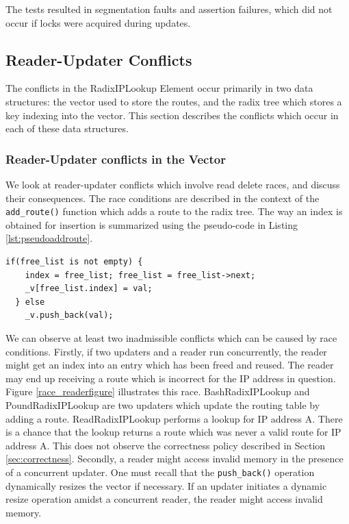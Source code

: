 \documentclass[a4paper]{article}
\begin{document}
The tests resulted in segmentation faults and assertion failures, which did not occur if locks were acquired during updates.
\subsection{Reader-Updater Conflicts}
The conflicts in the RadixIPLookup Element occur primarily in two data structures: the vector used to store the routes, and the radix tree which stores a key indexing into the vector. This section describes the conflicts which occur in each of these data structures.\\

\subsubsection{Reader-Updater conflicts in the Vector}
\label{sec:ruconflictsinthevector}
We look at reader-updater conflicts which involve read delete races, and discuss their consequences.
The race conditions are described in the context of the \verb+add_route()+ function which adds a route
to the radix tree. The way an index is obtained for insertion is
summarized using the pseudo-code in Listing \ref{lst:pseudoaddroute}.
\begin{lstlisting}[caption = Pseudo-code for acquiring an index in \texttt{add\_route()}, label=lst:pseudoaddroute]
  if(free_list is not empty) {
    index = free_list; free_list = free_list->next;
    _v[free_list.index] = val;
  } else
    _v.push_back(val);
\end{lstlisting}
We can observe at least two inadmissible conflicts which can be caused
by race conditions. Firstly, if two updaters and a reader run
concurrently, the reader might get an index into an entry which has
been freed and reused. The reader may end up receiving a route which
is incorrect for the IP address in question. Figure
\ref{race_readerfigure} illustrates this race. BashRadixIPLookup and
PoundRadixIPLookup are two updaters which update the routing table by
adding a route. ReadRadixIPLookup performs a lookup for IP address
A. There is a chance that the lookup returns a route which was never a
valid route for IP address A. This does not observe the correctness
policy described in Section \ref{sec:correctness}. Secondly, a reader
might access invalid memory in the presence of a concurrent
updater. One must recall that the \verb+push_back()+ operation
dynamically resizes the vector if necessary. If an updater initiates a
dynamic resize operation amidst a concurrent reader, the reader might
access invalid memory.
\end{document}
